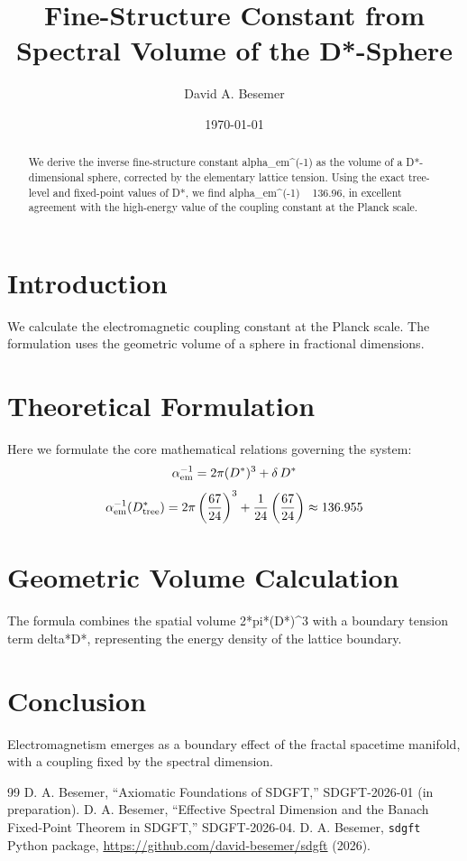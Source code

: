 \documentclass[amsmath,amssymb,aps,prd,twocolumn,superscriptaddress,nofootinbib]{revtex4-2}
\begin{document}

\title{Fine-Structure Constant from Spectral Volume of the D*-Sphere}

\author{David A. Besemer}

\date{\today}

\begin{abstract}
We derive the inverse fine-structure constant alpha_em^(-1) as the volume of a D*-dimensional sphere, corrected by the elementary lattice tension. Using the exact tree-level and fixed-point values of D*, we find alpha_em^(-1) ~ 136.96, in excellent agreement with the high-energy value of the coupling constant at the Planck scale.
\end{abstract}

\maketitle

\section{Introduction}
We calculate the electromagnetic coupling constant at the Planck scale. The formulation uses the geometric volume of a sphere in fractional dimensions.

\section{Theoretical Formulation}
Here we formulate the core mathematical relations governing the system:
\begin{equation}
  \alpha_{\mathrm{em}}^{-1} = 2\pi (D^{*})^3 + \delta\,D^{*}
\end{equation}
\begin{equation}
  \alpha_{\mathrm{em}}^{-1}(D^{*}_{\mathrm{tree}}) = 2\pi \left(\frac{67}{24}\right)^3 + \frac{1}{24}\left(\frac{67}{24}\right) \approx 136.955
\end{equation}
\section{Geometric Volume Calculation}
The formula combines the spatial volume 2*pi*(D*)^3 with a boundary tension term delta*D*, representing the energy density of the lattice boundary.

\section{Conclusion}
Electromagnetism emerges as a boundary effect of the fractal spacetime manifold, with a coupling fixed by the spectral dimension.



\begin{thebibliography}{99}
 D. A. Besemer, ``Axiomatic Foundations of SDGFT,'' SDGFT-2026-01 (in preparation).
 D. A. Besemer, ``Effective Spectral Dimension and the Banach Fixed-Point Theorem in SDGFT,'' SDGFT-2026-04.
 D. A. Besemer, \texttt{sdgft} Python package, \url{https://github.com/david-besemer/sdgft} (2026).
\end{thebibliography}
\end{document}
